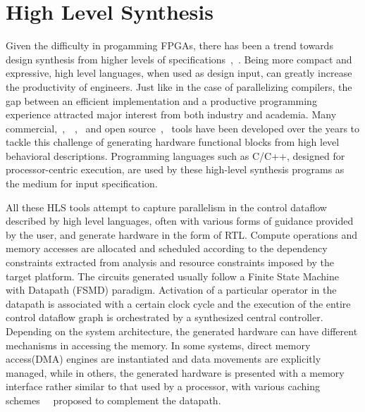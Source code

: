 \section{High Level Synthesis} 
\label{chap1:hls}
Given the difficulty in progamming FPGAs, there has
been a trend towards design synthesis from higher levels of
specifications~\cite{Coussy:2008:HSA:1457713},~\cite{intro2hls}. Being more compact and expressive, high level
languages, when used as design input, can greatly increase the
productivity of engineers. Just like in the case of parallelizing compilers, the gap between
an efficient implementation and a productive programming experience attracted major interest from 
both industry and academia. Many commercial,~\cite{tools:autoesl},~\cite{tools:catapultc}~\cite{tools:alterac2h},~\cite{tools:vivadohls} and open source~\cite{tools:legup},~\cite{tools:roccc} tools have been developed over the years 
to tackle this challenge of generating hardware functional blocks from high level
behavioral descriptions. Programming languages such as C/C++, designed for processor-centric execution, are used by these high-level synthesis programs as the medium for input specification. 

All these HLS tools attempt to capture parallelism in the control dataflow described by high level languages, often with various forms of guidance provided by the user, and 
generate hardware in the form of RTL.
Compute operations and memory accesses are allocated and scheduled according to the dependency constraints extracted
from analysis and resource constraints imposed by the target platform. The circuits generated usually follow
a Finite State Machine with Datapath (FSMD) paradigm. Activation of a particular operator in the datapath is associated
with a certain clock cycle and the execution of the entire control dataflow graph is orchestrated by 
a synthesized central controller. Depending on the system architecture, the generated hardware can have
different mechanisms in accessing the memory.
In some systems, direct memory access(DMA) engines are instantiated and data movements are explicitly managed, while 
in others, the generated
hardware is presented with a memory interface rather similar to that used by a processor, with various
caching schemes~\cite{6239785}~\cite{6239808} proposed to complement the datapath.

